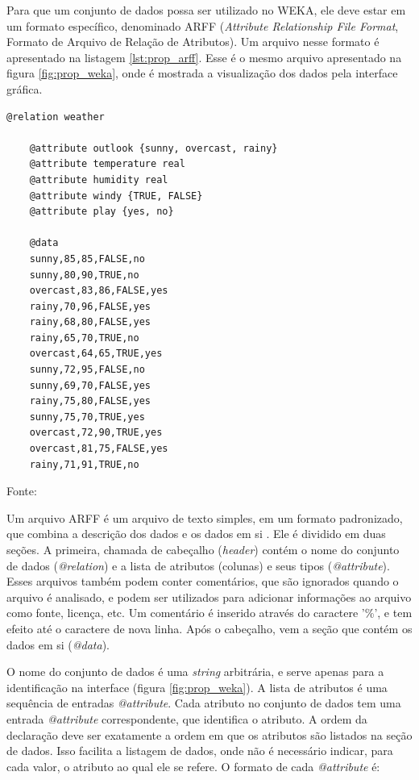 Para que um conjunto de dados possa ser utilizado no WEKA, ele deve estar em um formato específico, denominado ARFF (\emph{Attribute Relationship File Format}, Formato de Arquivo de Relação de Atributos). Um arquivo nesse formato é apresentado na listagem \ref{lst:prop_arff}. Esse é o mesmo arquivo apresentado na figura \ref{fig:prop_weka}, onde é mostrada a visualização dos dados pela interface gráfica.

\vspace{0.5cm}
\begin{lstlisting}[caption=Exemplo de arquivo no formato ARFF, label=lst:prop_arff]
    @relation weather

    @attribute outlook {sunny, overcast, rainy}
    @attribute temperature real
    @attribute humidity real
    @attribute windy {TRUE, FALSE}
    @attribute play {yes, no}

    @data
    sunny,85,85,FALSE,no
    sunny,80,90,TRUE,no
    overcast,83,86,FALSE,yes
    rainy,70,96,FALSE,yes
    rainy,68,80,FALSE,yes
    rainy,65,70,TRUE,no
    overcast,64,65,TRUE,yes
    sunny,72,95,FALSE,no
    sunny,69,70,FALSE,yes
    rainy,75,80,FALSE,yes
    sunny,75,70,TRUE,yes
    overcast,72,90,TRUE,yes
    overcast,81,75,FALSE,yes
    rainy,71,91,TRUE,no
\end{lstlisting}
\vspace{0.25cm}
\centerline{Fonte: \cite{Hall2009}}
\vspace{0.5cm}

Um arquivo ARFF é um arquivo de texto simples, em um formato padronizado, que combina a descrição dos dados e os dados em si \cite{Hall2009}. Ele é dividido em duas seções. A primeira, chamada de cabeçalho (\emph{header}) contém o nome do conjunto de dados (\emph{@relation}) e a lista de atributos (colunas) e seus tipos (\emph{@attribute}). Esses arquivos também podem conter comentários, que são ignorados quando o arquivo é analisado, e podem ser utilizados para adicionar informações ao arquivo como fonte, licença, etc. Um comentário é inserido através do caractere '\%', e tem efeito até o caractere de nova linha. Após o cabeçalho, vem a seção que contém os dados em si (\emph{@data}).

O nome do conjunto de dados é uma \emph{string} arbitrária, e serve apenas para a identificação na interface (figura \ref{fig:prop_weka}). A lista de atributos é uma sequência de entradas \emph{@attribute}. Cada atributo no conjunto de dados tem uma entrada \emph{@attribute} correspondente, que identifica o atributo. A ordem da declaração deve ser exatamente a ordem em que os atributos são listados na seção de dados. Isso facilita a listagem de dados, onde não é necessário indicar, para cada valor, o atributo ao qual ele se refere. O formato de cada \emph{@attribute} é:

